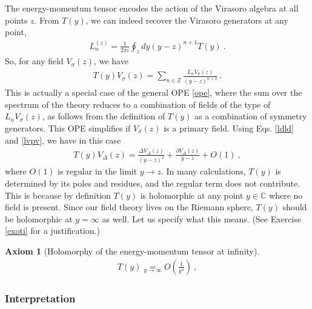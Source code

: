 \documentclass[12pt, a4paper, notitlepage, twoside]{report}
\numberwithin{equation}{section}
\theoremstyle{break}
\newtheorem{hyp}{Axiom}[chapter]
\begin{document}
The energy-momentum tensor encodes the action of the Virasoro algebra at all points $z$. 
From $T(y)$, we can indeed recover the Virasoro generators at any point,
\begin{align}
\boxed{ L_n^{(z)} = \frac{1}{2\pi i}\oint_{z} dy (y-z)^{n+1} T(y)} \ .
\label{lit}
\end{align}
So, for any field $V_\sigma(z)$, we have
\begin{align}
 T(y)V_\sigma(z) = \sum_{n\in{\mathbb{Z}}} \frac{L_n V_\sigma(z)}{(y-z)^{n+2}}\ .
\label{tv}
\end{align}
This is actually a special case of the general OPE \eqref{ope}, where the sum over the spectrum of the theory reduces to a combination of fields of the type of $L_n V_\sigma(z)$, as follows from the definition of $T(y)$ as a combination of symmetry generators.
This OPE simplifies if $V_\sigma(z)$ is a primary field. Using Eqs. \eqref{ldld} and \eqref{lvpv}, we have in this case
\begin{align}
 \boxed{T(y) V_\Delta(z) = \frac{\Delta V_\Delta(z)}{(y-z)^2} + \frac{\partial V_\Delta(z)}{y-z} + O(1)}\ ,
\label{tvp}
\end{align}
where $O(1)$ is regular in the limit $y\to z$.
In many calculations, $T(y)$ is determined by its poles and residues, and the regular term does not contribute.
This is because by definition $T(y)$ is holomorphic at any point $y\in\mathbb{C}$ where no field is present.
Since our field theory lives on the Riemann sphere, $T(y)$ should be holomorphic at $y=\infty$ as well. Let us specify what this means. (See Exercise \ref{exoti} for a justification.)

\begin{hyp}[Holomorphy of the energy-momentum tensor at infinity]
 \label{ax:hti}
 \begin{align}
 \boxed{T(y) \underset{y\to \infty}{=} O\left(\frac{1}{y^4}\right)}\ ,
\label{tyi}
\end{align}
\end{hyp} 
\noindent

\subsubsection{Interpretation}
\end{document}
